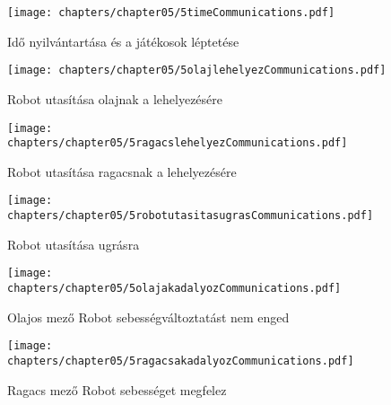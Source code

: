 \begin{figure}[h]
	\begin{center}
		\texttt{[image: chapters/chapter05/5timeCommunications.pdf]}
		\caption{Idő nyilvántartása és a játékosok léptetése}
		\label{fig:5timeCommunication}
	\end{center}
\end{figure}

\begin{figure}[h]
	\begin{center}
		\texttt{[image: chapters/chapter05/5olajlehelyezCommunications.pdf]}
		\caption{Robot utasítása olajnak a lehelyezésére}
		\label{fig:5robotolajlehelyezCommunication}
	\end{center}
\end{figure}

\begin{figure}[h]
	\begin{center}
		\texttt{[image: chapters/chapter05/5ragacslehelyezCommunications.pdf]}
		\caption{Robot utasítása ragacsnak a lehelyezésére}
		\label{fig:5robotragacslehelyezCommunication}
	\end{center}
\end{figure}

\begin{figure}[h]
	\begin{center}
		\texttt{[image: chapters/chapter05/5robotutasitasugrasCommunications.pdf]}
		\caption{Robot utasítása ugrásra}
		\label{fig:5robotutasitugrasCommunication}
	\end{center}
\end{figure}

\begin{figure}[h]
	\begin{center}
		\texttt{[image: chapters/chapter05/5olajakadalyozCommunications.pdf]}
		\caption{Olajos mező Robot sebességváltoztatást nem enged}
		\label{fig:5olajakadalyozCommunication}
	\end{center}
\end{figure}

\begin{figure}[h]
	\begin{center}
		\texttt{[image: chapters/chapter05/5ragacsakadalyozCommunications.pdf]}
		\caption{Ragacs mező Robot sebességet megfelez}
		\label{fig:5ragacsakadalyozCommunication}
	\end{center}
\end{figure}

\clearpage

